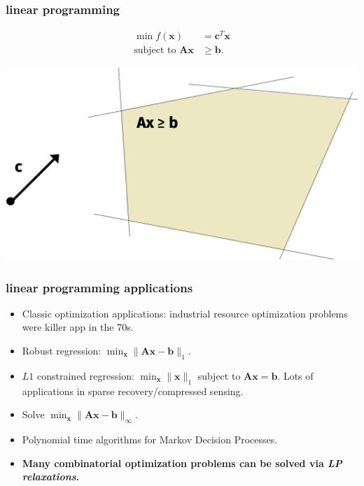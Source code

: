 \documentclass[compress]{beamer}
\newcommand{\bv}[1]{\mathbf{#1}}
\begin{document}
\begin{frame}[t]
	\frametitle{linear programming}
	\begin{align*}
		\min f(\bv{x}) &= \bv{c}^T\bv{x}\\
		\text{subject to } \bv{A}\bv{x} &\geq \bv{b}.
	\end{align*}
	
	\begin{center}
		\includegraphics[width=.8\textwidth]{lpexample.png}
	\end{center}
\end{frame}

\begin{frame}
		\frametitle{linear programming applications}
	\begin{itemize}
		\item Classic optimization applications: industrial resource optimization problems were killer app in the 70s.
		\item Robust regression: $\min_{\bv{x}} \|\bv{A} \bv{x} - \bv{b}\|_1$. 
		\item $L1$ constrained regression: $\min_{\bv{x}} \|\bv{x}\|_1$ subject to $\bv{A}\bv{x} = \bv{b}$. Lots of applications in sparse recovery/compressed sensing.
		\item Solve $\min_{\bv{x}}\|\bv{A} \bv{x} - \bv{b}\|_{\infty}$.   
		\item Polynomial time algorithms for Markov Decision Processes. 
		\item \alert{\textbf{Many combinatorial optimization problems can be solved via \emph{LP relaxations}.}}
	\end{itemize}
\end{frame}
\end{document}
